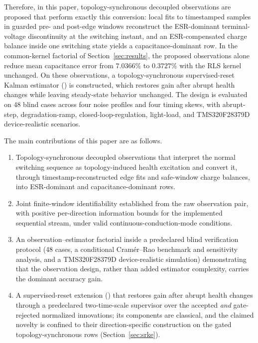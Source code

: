 Therefore, in this paper, topology-synchronous decoupled observations are proposed that perform exactly this conversion: local fits to timestamped samples in guarded pre- and post-edge windows reconstruct the ESR-dominant terminal-voltage discontinuity at the switching instant, and an ESR-compensated charge balance inside one switching state yields a capacitance-dominant row. In the common-kernel factorial of Section~\ref{sec:results}, the proposed observations alone reduce mean capacitance error from $7.0366\%$ to $0.3727\%$ with the RLS kernel unchanged. On these observations, a topology-synchronous supervised-reset Kalman estimator (\TSSRKE) is constructed, which restores gain after abrupt health changes while leaving steady-state behavior unchanged. The design is evaluated on 48 blind cases across four noise profiles and four timing skews, with abrupt-step, degradation-ramp, closed-loop-regulation, light-load, and TMS320F28379D device-realistic scenarios.

The main contributions of this paper are as follows.
\begin{enumerate}
\item Topology-synchronous decoupled observations that interpret the normal \Cuk{} switching sequence as topology-induced health excitation and convert it, through timestamp-reconstructed edge fits and safe-window charge balances, into ESR-dominant and capacitance-dominant rows.
\item Joint finite-window identifiability established from the raw observation pair, with positive per-direction information bounds for the implemented sequential stream, under valid continuous-conduction-mode conditions.
\item An observation--estimator factorial inside a predeclared blind verification protocol (48 cases, a conditional Cram\'er--Rao benchmark and sensitivity analysis, and a TMS320F28379D device-realistic simulation) demonstrating that the observation design, rather than added estimator complexity, carries the dominant accuracy gain.
\item A supervised-reset extension (\TSSRKE) that restores gain after abrupt health changes through a predeclared two-time-scale supervisor over the accepted \emph{and} gate-rejected normalized innovations; its components are classical, and the claimed novelty is confined to their direction-specific construction on the gated topology-synchronous rows (Section~\ref{sec:srke}).
\end{enumerate}

